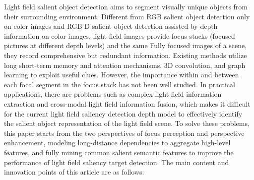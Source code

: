 \begin{englishabstract}
%
%
%
%
%
Light field salient object detection aims to segment visually unique objects from their surrounding environment.
Different from RGB salient object detection only on color images and RGB-D salient object detection assisted by depth information on color images, light field images provide focus stacks (focused pictures at different depth levels) and the same Fully focused images of a scene, they record comprehensive but redundant information. Existing methods utilize long short-term memory and attention mechanisms, 3D convolution, and graph learning to exploit useful clues. However, the importance within and between each focal segment in the focus stack has not been well studied. In practical applications, there are problems such as complex light field information extraction and cross-modal light field information fusion, which makes it difficult for the current light field saliency detection depth model to effectively identify the salient object representation of the light field scene. To solve these problems, this paper starts from the two perspectives of focus perception and perspective enhancement, modeling long-distance dependencies to aggregate high-level features, and fully mining common salient semantic features to improve the performance of light field saliency target detection. The main content and innovation points of this article are as follows:




\end{englishabstract}
